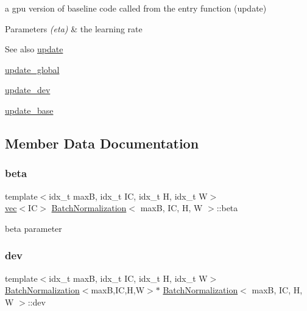a gpu version of baseline code called from the entry function (update) 


\begin{DoxyParams}{Parameters}
{\em (eta)} & the learning rate \\
\hline
\end{DoxyParams}
\begin{DoxySeeAlso}{See also}
\hyperlink{structBatchNormalization_a71b4c3d0b5002d84ba2d74f47f7ab8d2}{update} 

\hyperlink{linear_8h_a810703be28422bb9483665cbdbafd968}{update\+\_\+global} 

\hyperlink{structBatchNormalization_a463e10e6b59905d8c1e9bcac3a17a126}{update\+\_\+dev} 

\hyperlink{structBatchNormalization_a757cb54212040fca8bc2465bbac26636}{update\+\_\+base} 
\end{DoxySeeAlso}


\subsection{Member Data Documentation}
\mbox{\label{structBatchNormalization_a751b4044335ece13ce09f962168e8f1e}} 
\subsubsection{\texorpdfstring{beta}{beta}}
{\footnotesize\ttfamily template$<$idx\+\_\+t maxB, idx\+\_\+t IC, idx\+\_\+t H, idx\+\_\+t W$>$ \\
\hyperlink{structvec}{vec}$<$IC$>$ \hyperlink{structBatchNormalization}{Batch\+Normalization}$<$ maxB, IC, H, W $>$\+::beta}

beta parameter \mbox{\label{structBatchNormalization_a86d66680b05689ca3df6297e3fd6598e}} 
\subsubsection{\texorpdfstring{dev}{dev}}
{\footnotesize\ttfamily template$<$idx\+\_\+t maxB, idx\+\_\+t IC, idx\+\_\+t H, idx\+\_\+t W$>$ \\
\hyperlink{structBatchNormalization}{Batch\+Normalization}$<$maxB,IC,H,W$>$$\ast$ \hyperlink{structBatchNormalization}{Batch\+Normalization}$<$ maxB, IC, H, W $>$\+::dev}

